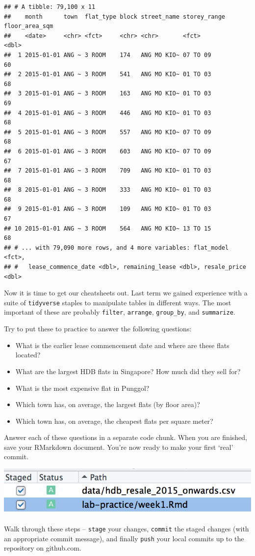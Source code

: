 \documentclass[]{book}
\providecommand{\tightlist}{%
  \setlength{\itemsep}{0pt}\setlength{\parskip}{0pt}}
\begin{document}
\begin{verbatim}
## # A tibble: 79,100 x 11
##    month      town  flat_type block street_name storey_range floor_area_sqm
##    <date>     <chr> <fct>     <chr> <chr>       <fct>                 <dbl>
##  1 2015-01-01 ANG ~ 3 ROOM    174   ANG MO KIO~ 07 TO 09                 60
##  2 2015-01-01 ANG ~ 3 ROOM    541   ANG MO KIO~ 01 TO 03                 68
##  3 2015-01-01 ANG ~ 3 ROOM    163   ANG MO KIO~ 01 TO 03                 69
##  4 2015-01-01 ANG ~ 3 ROOM    446   ANG MO KIO~ 01 TO 03                 68
##  5 2015-01-01 ANG ~ 3 ROOM    557   ANG MO KIO~ 07 TO 09                 68
##  6 2015-01-01 ANG ~ 3 ROOM    603   ANG MO KIO~ 07 TO 09                 67
##  7 2015-01-01 ANG ~ 3 ROOM    709   ANG MO KIO~ 01 TO 03                 68
##  8 2015-01-01 ANG ~ 3 ROOM    333   ANG MO KIO~ 01 TO 03                 68
##  9 2015-01-01 ANG ~ 3 ROOM    109   ANG MO KIO~ 01 TO 03                 67
## 10 2015-01-01 ANG ~ 3 ROOM    564   ANG MO KIO~ 13 TO 15                 68
## # ... with 79,090 more rows, and 4 more variables: flat_model <fct>,
## #   lease_commence_date <dbl>, remaining_lease <dbl>, resale_price <dbl>
\end{verbatim}

Now it is time to get our cheatsheets out. Last term we gained experience with a suite of \texttt{tidyverse} staples to manipulate tables in different ways. The most important of these are probably \texttt{filter}, \texttt{arrange}, \texttt{group\_by}, and \texttt{summarize}.

Try to put these to practice to answer the following questions:

\begin{itemize}
\tightlist
\item
  What is the earlier lease commencement date and where are these flats located?
\item
  What are the largest HDB flats in Singapore? How much did they sell for?
\item
  What is the most expensive flat in Punggol?
\item
  Which town has, on average, the largest flats (by floor area)?
\item
  Which town has, on average, the cheapest flats per square meter?
\end{itemize}

Answer each of these questions in a separate code chunk. When you are finished, save your RMarkdown document. You're now ready to make your first `real' commit.

\includegraphics{images/final_commit.png}

Walk through these steps -- \texttt{stage} your changes, \texttt{commit} the staged changes (with an appropriate commit message), and finally \texttt{push} your local commits up to the repository on github.com.


\end{document}
